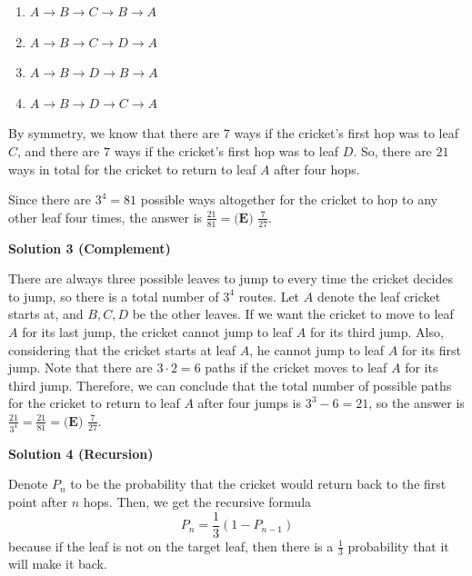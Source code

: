 \begin{enumerate}
\begin{enumerate}
        \item $A \rightarrow B \rightarrow C \rightarrow B \rightarrow A$

        \item $A \rightarrow B \rightarrow C \rightarrow D \rightarrow A$

        \item $A \rightarrow B \rightarrow D \rightarrow B \rightarrow A$

        \item $A \rightarrow B \rightarrow D \rightarrow C \rightarrow A$

            \end{enumerate}
            By symmetry, we know that there are $7$ ways if the cricket's first hop was to leaf $C$, and there are $7$ ways if the cricket's first hop was to leaf $D$. So, there are $21$ ways in total for the cricket to return to leaf $A$ after four hops.

 Since there are $3^4 = 81$ possible ways altogether for the cricket to hop to any other leaf four times, the answer is $\frac{21}{81} = \boxed{\textbf{(E) }\frac{7}{27}}$.

 



\textbf{Solution 3 (Complement)}

There are always three possible leaves to jump to every time the cricket decides to jump, so there is a total number of $3^4$ routes. Let $A$ denote the leaf cricket starts at, and $B, C, D$ be the other leaves. If we want the cricket to move to leaf $A$ for its last jump, the cricket cannot jump to leaf $A$ for its third jump. Also, considering that the cricket starts at leaf $A$, he cannot jump to leaf $A$ for its first jump. Note that there are $3\cdot2=6$ paths if the cricket moves to leaf $A$ for its third jump. Therefore, we can conclude that the total number of possible paths for the cricket to return to leaf $A$ after four jumps is $3^3 - 6 = 21$, so the answer is $\frac{21}{3^4} = \frac{21}{81}=\boxed{\textbf{(E) }\frac{7}{27}}$.

 



\textbf{Solution 4 (Recursion)}

Denote $P_n$ to be the probability that the cricket would return back to the first point after $n$ hops. Then, we get the recursive formula 
 \[P_n = \frac13(1-P_{n-1})\] because if the leaf is not on the target leaf, then there is a $\frac13$ probability that it will make it back.


\end{enumerate}
